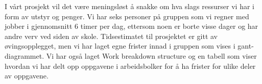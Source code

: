I vårt prosjekt vil det være meningsløst å snakke om hva slags ressurser vi har i form av utstyr og penger. Vi har seks personer på gruppen som vi regner med jobber i gjennomsnitt 6 timer per dag, ettersom noen er borte visse dager og har andre verv ved siden av skole. Tidsestimatet til prosjektet er gitt av øvingsopplegget, men vi har laget egne frister innad i gruppen som vises i gant-diagrammet. Vi har også laget Work breakdown structure og en tabell som viser hvordan vi har delt opp oppgavene i arbeidsbolker for å ha frister for ulike deler av oppgavene.